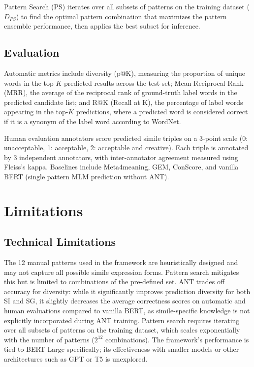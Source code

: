 \documentclass[12pt]{article}
\begin{document}
Pattern Search (PS) iterates over all subsets of patterns on the training dataset ($D_{PS}$) to find the optimal pattern combination that maximizes the pattern ensemble performance, then applies the best subset for inference.

\subsection{Evaluation}

Automatic metrics include diversity (p@K), measuring the proportion of unique words in the top-$K$ predicted results across the test set; Mean Reciprocal Rank (MRR), the average of the reciprocal rank of ground-truth label words in the predicted candidate list; and R@K (Recall at K), the percentage of label words appearing in the top-$K$ predictions, where a predicted word is considered correct if it is a synonym of the label word according to WordNet.

Human evaluation annotators score predicted simile triples on a 3-point scale (0: unacceptable, 1: acceptable, 2: acceptable and creative). Each triple is annotated by 3 independent annotators, with inter-annotator agreement measured using Fleiss's kappa. Baselines include Meta4meaning, GEM, ConScore, and vanilla BERT (single pattern MLM prediction without ANT).

\section{Limitations}

\subsection{Technical Limitations}

The 12 manual patterns used in the framework are heuristically designed and may not capture all possible simile expression forms. Pattern search mitigates this but is limited to combinations of the pre-defined set. ANT trades off accuracy for diversity: while it significantly improves prediction diversity for both SI and SG, it slightly decreases the average correctness scores on automatic and human evaluations compared to vanilla BERT, as simile-specific knowledge is not explicitly incorporated during ANT training. Pattern search requires iterating over all subsets of patterns on the training dataset, which scales exponentially with the number of patterns ($2^{12}$ combinations). The framework's performance is tied to BERT-Large specifically; its effectiveness with smaller models or other architectures such as GPT or T5 is unexplored.
\end{document}
